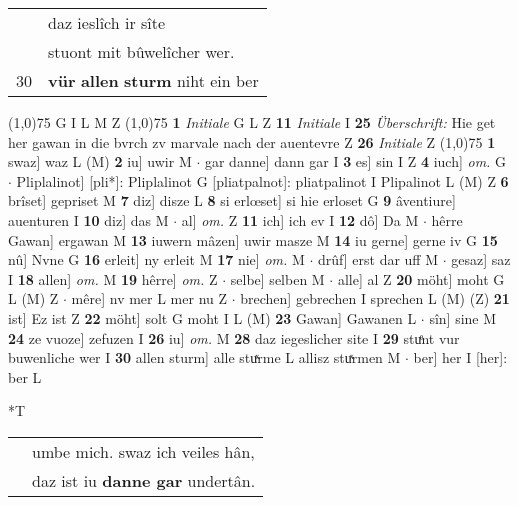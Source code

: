 \documentclass[8pt,a4paper,notitlepage]{article}
\begin{document}
\begin{table}[ht]
\begin{minipage}[t]{0.5\linewidth}
\begin{tabular}{rl}
 & daz ieslîch ir sîte\\ 
 & stuont mit bûwelîcher wer.\\ 
30 & \textbf{vür} \textbf{allen} \textbf{sturm} niht ein ber\\ 
\end{tabular}
\scriptsize
\line(1,0){75} \newline
G I L M Z \newline
\line(1,0){75} \newline
\textbf{1} \textit{Initiale} G L Z  \textbf{11} \textit{Initiale} I  \textbf{25} \textit{Überschrift:} Hie get her gawan in die bvrch zv marvale nach der auentevre Z  \textbf{26} \textit{Initiale} Z  \newline
\line(1,0){75} \newline
\textbf{1} swaz] waz L (M) \textbf{2} iu] uwir M  $\cdot$ gar danne] dann gar I \textbf{3} es] sin I Z \textbf{4} iuch] \textit{om.} G  $\cdot$ Pliplalinot] [pli*]: Pliplalinot G [pliatpalnot]: pliatpalinot I Plipalinot L (M) Z \textbf{6} brîset] gepriset M \textbf{7} diz] disze L \textbf{8} si erlœset] si hie erloset G \textbf{9} âventiure] auenturen I \textbf{10} diz] das M  $\cdot$ al] \textit{om.} Z \textbf{11} ich] ich ev I \textbf{12} dô] Da M  $\cdot$ hêrre Gawan] ergawan M \textbf{13} iuwern mâzen] uwir masze M \textbf{14} iu gerne] gerne iv G \textbf{15} nû] Nvne G \textbf{16} erleit] ny erleit M \textbf{17} nie] \textit{om.} M  $\cdot$ drûf] erst dar uff M  $\cdot$ gesaz] saz I \textbf{18} allen] \textit{om.} M \textbf{19} hêrre] \textit{om.} Z  $\cdot$ selbe] selben M  $\cdot$ alle] al Z \textbf{20} möht] moht G L (M) Z  $\cdot$ mêre] nv mer L mer nu Z  $\cdot$ brechen] gebrechen I sprechen L (M) (Z) \textbf{21} ist] Ez ist Z \textbf{22} möht] solt G moht I L (M) \textbf{23} Gawan] Gawanen L  $\cdot$ sîn] sine M \textbf{24} ze vuoze] zefuzen I \textbf{26} iu] \textit{om.} M \textbf{28} daz iegeslicher site I \textbf{29} stuͤnt vur buwenliche wer I \textbf{30} allen sturm] alle stuͯrme L allisz stuͯrmen M  $\cdot$ ber] her I [her]: ber L \newline
\end{minipage}
\hspace{0.5cm}
\begin{minipage}[t]{0.5\linewidth}
\small
\begin{center}*T
\end{center}
\begin{tabular}{rl}
 & umbe mich. swaz ich veiles hân,\\ 
 & daz ist iu \textbf{danne gar} undertân.\\ 

\end{tabular}
\end{minipage}
\end{table}
\end{document}
